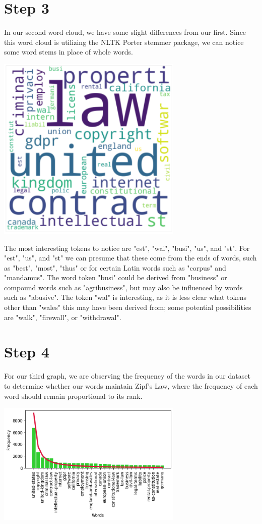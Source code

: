 \documentclass{article}
\begin{document}
\section{Step 3}

In our second word cloud, we have some slight differences from our first. Since this word cloud is utilizing the NLTK Porter stemmer package, we can notice some word stems in place of whole words. 

\begin{center}
\includegraphics[width=3.5in]{images/image3.png}
\end{center}

The most interesting tokens to notice are "est", "wal", "busi", "us", and "st". For "est", "us", and "st" we can presume that these come from the ends of words, such as "best", "most", "thus" or for certain Latin words such as "corpus" and "mandamus". The word token "busi" could be derived from "business" or compound words such as "agribusiness", but may also be influenced by words such as "abusive". The token "wal" is interesting, as it is less clear what tokens other than "wales" this may have been derived from; some potential possibilities are "walk", "firewall", or "withdrawal".

\section{Step 4}

For our third graph, we are observing the frequency of the words in our dataset to determine whether our words maintain Zipf's Law, where the frequency of each word should remain proportional to its rank.

\begin{center}
\includegraphics[width=3.5in]{images/image1.png}
\end{center}
\end{document}

